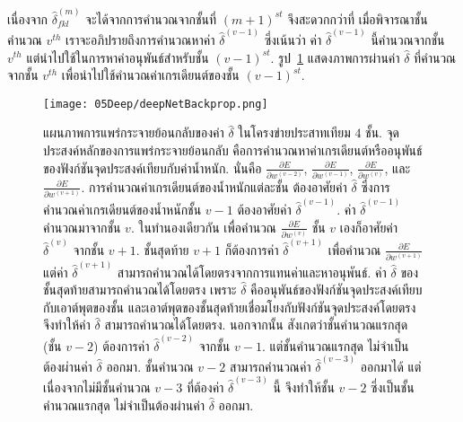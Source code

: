 เนื่องจาก $\hat{\delta}_{fkl}^{(m)}$ จะได้จากการคำนวณจากชั้นที่ $(m+1)^{st}$
จึงสะดวกกว่าที่ เมื่อพิจารณาชั้นคำนวณ $v^{th}$ 
เราจะอภิปรายถึงการคำนวณหาค่า $\hat{\delta}^{(v-1)}$ ซึ่งเน้นว่า 
ค่า $\hat{\delta}^{(v-1)}$ นี้คำนวณจากชั้น $v^{th}$ 
แต่นำไปใช้ในการหาค่าอนุพันธ์สำหรับชั้น $(v-1)^{st}$.
รูป~\ref{fig: Deep Back Prop delta hat} แสดงภาพการผ่านค่า $\hat{\delta}$ ที่คำนวณจากชั้น $v^{th}$ เพื่อนำไปใช้คำนวณค่าเกรเดียนต์ของชั้น $(v-1)^{st}$.


%
\begin{figure}
	\begin{center}
		\texttt{[image: 05Deep/deepNetBackprop.png]}
		\caption[การแพร่กระจายย้อนกลับเป็นชั้น ๆ]{แผนภาพการแพร่กระจายย้อนกลับของค่า $\hat{\delta}$ ในโครงข่ายประสาทเทียม $4$ ชั้น.
			จุดประสงค์หลักของการแพร่กระจายย้อนกลับ คือการคำนวณหาค่าเกรเดียนต์หรืออนุพันธ์ของฟังก์ชันจุดประสงค์เทียบกับค่าน้ำหนัก.
			นั่นคือ $\frac{\partial E}{\partial w^{(v-2)}}$, $\frac{\partial E}{\partial w^{(v-1)}}$, $\frac{\partial E}{\partial w^{(v)}}$, และ $\frac{\partial E}{\partial w^{(v+1)}}$.
			การคำนวณค่าเกรเดียนต์ของน้ำหนักแต่ละชั้น ต้องอาศัยค่า $\hat{\delta}$
			ซึ่งการคำนวณค่าเกรเดียนต์ของน้ำหนักชั้น $v-1$
			ต้องอาศัยค่า $\hat{\delta}^{(v-1)}$.
			ค่า $\hat{\delta}^{(v-1)}$ คำนวณมาจากชั้น $v$.
			ในทำนองเดียวกัน 
			เพื่อคำนวณ $\frac{\partial E}{\partial w^{(v)}}$ ชั้น $v$ เองก็อาศัยค่า $\hat{\delta}^{(v)}$ จากชั้น $v+1$.
			ชั้นสุดท้าย $v+1$ ก็ต้องการค่า $\hat{\delta}^{(v+1)}$ เพื่อคำนวณ $\frac{\partial E}{\partial w^{(v+1)}}$
			แต่ค่า $\hat{\delta}^{(v+1)}$ สามารถคำนวณได้โดยตรงจากการแทนค่าและหาอนุพันธ์.
			ค่า $\hat{\delta}$ ของชั้นสุดท้ายสามารถคำนวณได้โดยตรง เพราะ $\hat{\delta}$ คืออนุพันธ์ของฟังก์ชันจุดประสงค์เทียบกับเอาต์พุตของชั้น และเอาต์พุตของชั้นสุดท้ายเชื่อมโยงกับฟังก์ชันจุดประสงค์โดยตรง จึงทำให้ค่า $\hat{\delta}$ สามารถคำนวณได้โดยตรง.
			นอกจากนั้น สังเกตว่าชั้นคำนวณแรกสุด (ชั้น $v-2$) ต้องการค่า $\hat{\delta}^{(v-2)}$ จากชั้น $v-1$.
			แต่ชั้นคำนวณแรกสุด ไม่จำเป็นต้องผ่านค่า $\hat{\delta}$ ออกมา.
			ชั้นคำนวณ $v-2$ สามารถคำนวณค่า $\hat{\delta}^{(v-3)}$ ออกมาได้ แต่เนื่องจากไม่มีชั้นคำนวณ $v-3$ ที่ต้องค่า $\hat{\delta}^{(v-3)}$ นี้ จึงทำให้ชั้น $v-2$ ซึ่งเป็นชั้นคำนวณแรกสุด ไม่จำเป็นต้องผ่านค่า $\hat{\delta}$ ออกมา.
		}
		\label{fig: Deep Back Prop delta hat}
	\end{center}
\end{figure}
%




